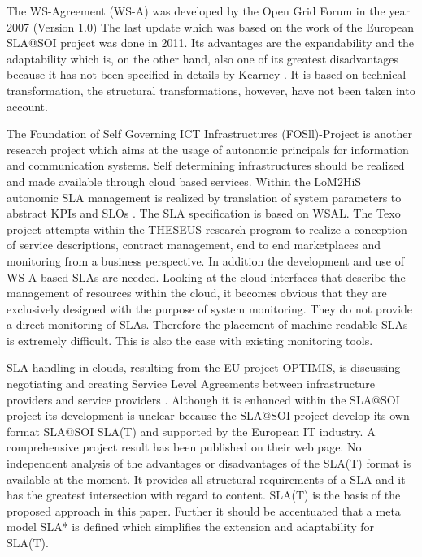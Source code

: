 The WS-Agreement (WS-A) was developed by the Open Grid Forum in the year 2007 (Version 1.0) The last update which was based on the work of the European SLA@SOI project was done in 2011. Its advantages are the expandability and the adaptability which is, on the other hand, also one of its greatest disadvantages because it has not been specified in details by Kearney \cite{Kearney2011b}. It is based on technical transformation, the structural transformations, however, have not been taken into account.

The Foundation of Self Governing ICT Infrastructures (FOSll)-Project \cite{fosii} is another research project which aims at the usage of autonomic principals for information and communication systems. Self determining infrastructures should be realized and made available through cloud based services. Within the LoM2HiS autonomic SLA management is realized by translation of system parameters to abstract KPIs and SLOs  \cite{Brandic:2009:VFE:1616056.1616063}. The SLA specification is based on WSAL. The Texo project \cite{texo2011} attempts within the THESEUS research program to realize a conception of service descriptions, contract management, end to end marketplaces and monitoring from a business perspective. In addition the development and use of WS-A based SLAs are needed. Looking at the cloud interfaces that describe the management of resources within the cloud, it becomes obvious that they are exclusively designed with the purpose of system monitoring. They do not provide a direct monitoring of SLAs. Therefore the placement of machine readable SLAs is extremely difficult. This is also the case with existing monitoring tools.

SLA handling in clouds, resulting from the EU project OPTIMIS, is discussing negotiating and creating Service Level Agreements between infrastructure providers and service providers \cite{Lawrence:2010:USL:2050107.2050112}.
Although it is enhanced within the SLA@SOI project \cite{slasoi2011} its development is unclear because the SLA@SOI project develop its own format SLA@SOI SLA(T) \cite{slasoiwiki} and supported by the European IT industry. A comprehensive project result has been published on their web page. No independent analysis of the advantages or disadvantages of the SLA(T) format is available at the moment. It provides all structural requirements of a SLA and it has the greatest intersection with regard to content. SLA(T) is the basis of the proposed approach in this paper. Further it should be accentuated that a meta model SLA* \cite{slasoisrc} is defined which simplifies the extension and adaptability for SLA(T).

